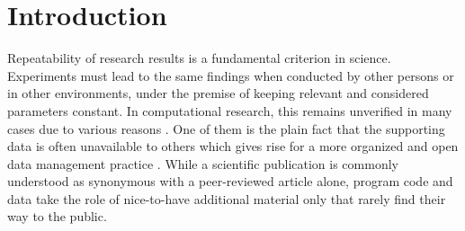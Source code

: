\documentclass{sig-alternate}
\begin{document}
\newpage






\section{Introduction}

Repeatability of research results is a fundamental criterion in science. %
Experiments must lead to the same findings when conducted by other persons or in other environments, under the premise of keeping relevant and considered parameters constant.
In computational research, this remains unverified in many cases due to various reasons \cite{Peng02122011}.
One of them is the plain fact that the supporting data is often unavailable to others which gives rise for a more organized and open data management practice \cite{Wood1298248}.
While a scientific publication is commonly understood as synonymous with a peer-reviewed article alone, program code and data take the role of nice-to-have additional material only that rarely find their way to the public.
\end{document}
